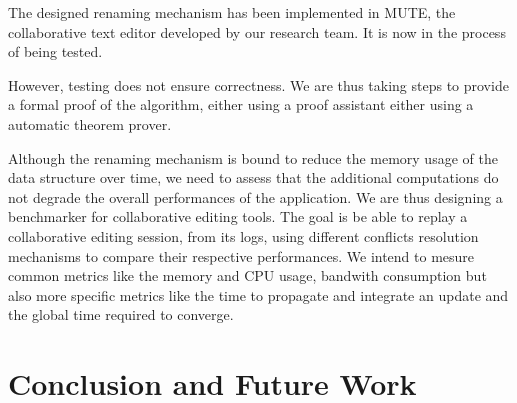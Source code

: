 \documentclass[sigplan]{acmart}
\begin{document}
The designed renaming mechanism has been implemented in MUTE, the collaborative text editor developed by our research team.
It is now in the process of being tested.

However, testing does not ensure correctness.
We are thus taking steps to provide a formal proof of the algorithm, either using a proof assistant either using a automatic theorem prover.

Although the renaming mechanism is bound to reduce the memory usage of the data structure over time, we need to assess that the additional computations do not degrade the overall performances of the application.
We are thus designing a benchmarker for collaborative editing tools.
The goal is be able to replay a collaborative editing session, from its logs, using different conflicts resolution mechanisms to compare their respective performances.
We intend to mesure common metrics like the memory and CPU usage, bandwith consumption but also more specific metrics like the time to propagate and integrate an update and the global time required to converge.

\section{Conclusion and Future Work}







\end{document}
